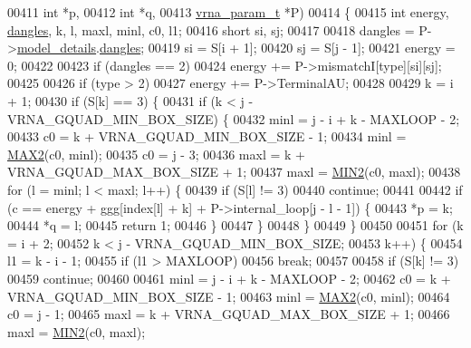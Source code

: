 \begin{DoxyCode}
00411                         \textcolor{keywordtype}{int}           *p,
00412                         \textcolor{keywordtype}{int}           *q,
00413                         \hyperlink{group__energy__parameters_structvrna__param__s}{vrna\_param\_t}  *P)
00414 \{
00415   \textcolor{keywordtype}{int}   energy, \hyperlink{group__model__details_ga72b511ed1201f7e23ec437e468790d74}{dangles}, k, l, maxl, minl, c0, l1;
00416   \textcolor{keywordtype}{short} si, sj;
00417 
00418   dangles = P->\hyperlink{group__energy__parameters_a7b84353eb9075c595bad4ceb871bcae7}{model\_details}.\hyperlink{group__model__details_adcda4ff2ea77748ae0e8700288282efc}{dangles};
00419   si      = S[i + 1];
00420   sj      = S[j - 1];
00421   energy  = 0;
00422 
00423   \textcolor{keywordflow}{if} (dangles == 2)
00424     energy += P->mismatchI[type][si][sj];
00425 
00426   \textcolor{keywordflow}{if} (type > 2)
00427     energy += P->TerminalAU;
00428 
00429   k = i + 1;
00430   \textcolor{keywordflow}{if} (S[k] == 3) \{
00431     \textcolor{keywordflow}{if} (k < j - VRNA\_GQUAD\_MIN\_BOX\_SIZE) \{
00432       minl  = j - i + k - MAXLOOP - 2;
00433       c0    = k + VRNA\_GQUAD\_MIN\_BOX\_SIZE - 1;
00434       minl  = \hyperlink{group__utils_ga33297b3679c713b0c4d897cd0fe3b122}{MAX2}(c0, minl);
00435       c0    = j - 3;
00436       maxl  = k + VRNA\_GQUAD\_MAX\_BOX\_SIZE + 1;
00437       maxl  = \hyperlink{group__utils_gae0b9cd0ce090bd69b951aa73e8fa4f7d}{MIN2}(c0, maxl);
00438       \textcolor{keywordflow}{for} (l = minl; l < maxl; l++) \{
00439         \textcolor{keywordflow}{if} (S[l] != 3)
00440           \textcolor{keywordflow}{continue};
00441 
00442         \textcolor{keywordflow}{if} (c == energy + ggg[index[l] + k] + P->internal\_loop[j - l - 1]) \{
00443           *p  = k;
00444           *q  = l;
00445           \textcolor{keywordflow}{return} 1;
00446         \}
00447       \}
00448     \}
00449   \}
00450 
00451   \textcolor{keywordflow}{for} (k = i + 2;
00452        k < j - VRNA\_GQUAD\_MIN\_BOX\_SIZE;
00453        k++) \{
00454     l1 = k - i - 1;
00455     \textcolor{keywordflow}{if} (l1 > MAXLOOP)
00456       \textcolor{keywordflow}{break};
00457 
00458     \textcolor{keywordflow}{if} (S[k] != 3)
00459       \textcolor{keywordflow}{continue};
00460 
00461     minl  = j - i + k - MAXLOOP - 2;
00462     c0    = k + VRNA\_GQUAD\_MIN\_BOX\_SIZE - 1;
00463     minl  = \hyperlink{group__utils_ga33297b3679c713b0c4d897cd0fe3b122}{MAX2}(c0, minl);
00464     c0    = j - 1;
00465     maxl  = k + VRNA\_GQUAD\_MAX\_BOX\_SIZE + 1;
00466     maxl  = \hyperlink{group__utils_gae0b9cd0ce090bd69b951aa73e8fa4f7d}{MIN2}(c0, maxl);

\end{DoxyCode}

